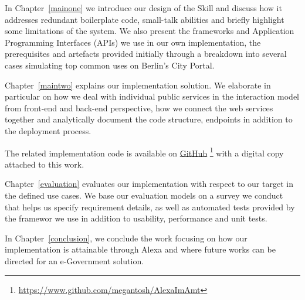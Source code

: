 In Chapter~\ref{mainone} we introduce our design of the Skill and discuss how it 
addresses
redundant boilerplate code, small-talk abilities and briefly highlight some limitations of the system. We also present the frameworks 
	and Application Programming Interfaces (APIs)
 we use in our own implementation, the prerequisites and artefacts provided initially through a breakdown into several cases simulating top common uses on Berlin's City Portal. %


Chapter~\ref{maintwo} 
explains our implementation solution. We elaborate in particular on how we deal with individual public services in the interaction model from front-end and back-end perspective, how we connect the web services together and analytically document the code structure, endpoints in addition to the deployment process.

The related implementation code is available on \href{https://www.github.com/megantosh/AlexaImAmt}{GitHub} \footnote{\url{https://www.github.com/megantosh/AlexaImAmt} 
} with a digital copy attached to this work. 

Chapter~\ref{evaluation} evaluates our implementation with respect to our target in the defined %
use cases. We base our evaluation models on a survey we conduct that helps us specify requirement details, as well as automated tests provided by the framewor we use in addition to usability, performance and unit tests. 

In Chapter~\ref{conclusion}, we conclude the work focusing on how our implementation %
is attainable through Alexa and where future works can be directed for an e-Government solution.
